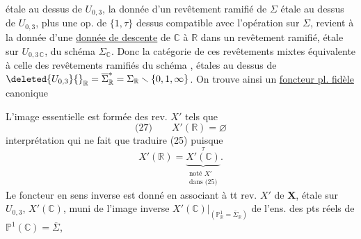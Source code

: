 étale au dessus de \inserted{$\overline\Sigma^*=$} $U_{0,3}$,  la donnée d'un revêtement ramifié de $\Sigma$ étale au dessus de $U_{0,3}$, plus une op. de $\{1,\tau\}$ dessus compatible avec l'opération sur $\Sigma$, revient à la donnée d'une \uline{donnée de descente} de $\mathbb C$ à $\mathbb R$ dans un revêtement ramifié, étale sur $U_{0,3\,\mathbb C}$, du \deleted{$\unsure{\Sigma}$}schéma $\Sigma_{\mathbb C}$. Donc la catégorie de ces revêtements mixtes  équivalente à celle des revêtements ramifiés du schéma , étales au dessus de $\deleted{U_{0,3}}{}_{\mathbb R}=\overline\Sigma_{\mathbb R}^*=\Sigma_{\mathbb R}\smallsetminus\{0,1,\infty\}$. On trouve ainsi un \uline{foncteur pl. fidèle} canonique

L'image essentielle est formée des rev. $X'$ tels que 
\[
\text{(27)}\qquad X'(\mathbb R)=\varnothing
\]
interprétation qui ne fait que traduire (25) puisque
\[
X'(\mathbb R)=\underbrace{X'(\mathbb C)}_{\substack{\text{noté }X'\\\text{dans (25)}}}^{\tau}.
\]
Le foncteur en sens inverse est donné en associant à tt rev.  $X'$ de $\mathbf X$, étale sur $U_{0,3}$,  $X'(\mathbb C)$, muni de l'image inverse $\left.X'(\mathbb C)\right|_{(\mathbb P^1_{\mathbb R}=\overline\Sigma_{\mathbb R})}$ de l'ens. des pts réels de $\mathbb P^1(\mathbb C)=\overline\Sigma$,
